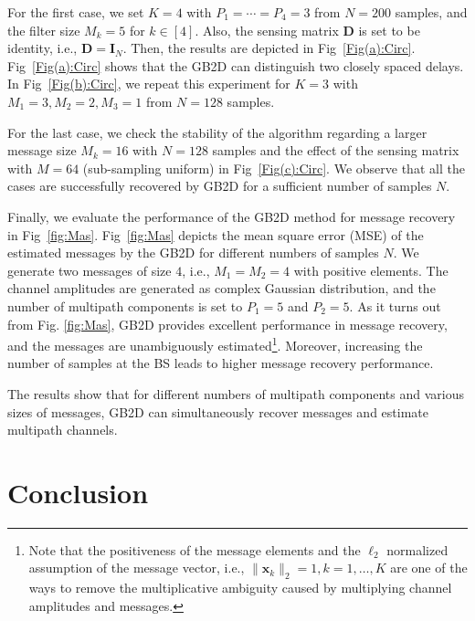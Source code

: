 \documentclass[conference,10pt]{IEEEtran}
\theoremstyle{remark}
\theoremstyle{plain}
\theoremstyle{definition}
\theoremstyle{remark}
\begin{document}
For the first case,  we set $K=4$ with $P_1=\cdots=P_4=3$ from $N=200$ samples, and the filter size $M_k=5$ for $k\in [4]$. Also, the sensing matrix $\bm{D}$ is set to be identity, i.e., $\bm{D}=\bm{I}_N$. Then, the results are depicted in Fig~\ref{Fig(a):Circ}. Fig~\ref{Fig(a):Circ} shows that  the \ac{GB2D} can distinguish two closely spaced delays. In Fig~\ref{Fig(b):Circ}, we repeat this experiment for $K=3$ with $M_1=3,M_2=2,M_3=1$ from $N=128$ samples.  


For the last case, we check the stability of the algorithm regarding a larger message size $M_k=16$ with $N=128$ samples and the effect of the sensing matrix with $M=64$ (sub-sampling uniform) in Fig~\ref{Fig(c):Circ}. We observe that all the cases are successfully recovered by \ac{GB2D} for a sufficient number of samples $N$. 

Finally, we evaluate the performance of the \ac{GB2D} method for message recovery in Fig~\ref{fig:Mas}.  Fig~\ref{fig:Mas} depicts the mean square error (MSE) of the estimated messages by the \ac{GB2D} for different numbers of samples $N$. We generate two messages of size $4$, i.e.,  $M_1 = M_2= 4$ with positive elements. The channel amplitudes are generated as complex Gaussian distribution, and the number of multipath components is set to $P_1 = 5$ and $P_2 = 5$. As it turns out from Fig. \ref{fig:Mas}, \ac{GB2D} provides excellent performance in message recovery, and the messages are unambiguously estimated\footnote{Note that the positiveness of the message elements and the $\ell_2$ normalized assumption of the message vector, i.e., $\|\bm{x}_k\|_2=1, k=1, \ldots, K$ are one of the ways to remove the multiplicative ambiguity caused by multiplying channel amplitudes and messages.}. Moreover, increasing the number of samples at the \ac{BS} leads to higher message recovery performance. 

The results show that for different numbers of multipath components and various sizes of messages, \ac{GB2D} can simultaneously recover messages and estimate multipath channels.  


\section{Conclusion}\label{sec.conclusion}
\end{document}
